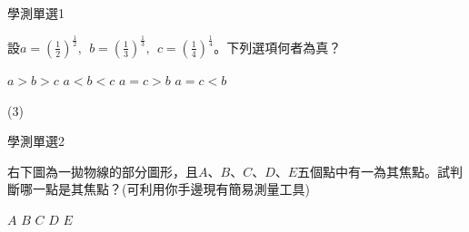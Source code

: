\begin{QUESTIONS}
    \begin{QUESTION}
        \begin{ExamInfo}{90}{學測}{單選}{1}
        \end{ExamInfo}
        \begin{ExamAnsRateInfo}{}{}{}{}
        \end{ExamAnsRateInfo}
        \begin{QBODY}
            設$a={{\left( \frac{1}{2} \right)}^{\frac{1}{2}}},\ \ b={{\left( \frac{1}{3} \right)}^{\frac{1}{3}}},\ \ c={{\left( \frac{1}{4} \right)}^{\frac{1}{4}}}$。下列選項何者為真？
            \begin{QOPS}         
                \QOP $ a > b > c $
                \QOP $ a < b < c $
                \QOP $ a = c > b $
                \QOP $ a = c < b $
            \end{QOPS}
        \end{QBODY}
        \begin{QFROMS}
        \end{QFROMS}
        \begin{QTAGS}\end{QTAGS}
        \begin{QANS}
            (3)
        \end{QANS}
        \begin{QSOLLIST}
        \end{QSOLLIST}
        \begin{QEMPTYSPACE}
        \end{QEMPTYSPACE}
    \end{QUESTION}
    \begin{QUESTION}
        \begin{ExamInfo}{90}{學測}{單選}{2}
        \end{ExamInfo}
        \begin{ExamAnsRateInfo}{}{}{}{}
        \end{ExamAnsRateInfo}
        \begin{QBODY}
            右下圖為一拋物線的部分圖形，且$ A $、$ B $、$ C $、$ D $、$ E $五個點中有一為其焦點。試判斷哪一點是其焦點？(可利用你手邊現有簡易測量工具)
			\begin{QOPS}
				\QOP $A$
				\QOP $B$
				\QOP $C$
				\QOP $D$
				\QOP $E$
			\end{QOPS}
        \end{QBODY}
        \begin{QFROMS}

\end{QFROMS}
\end{QUESTION}
\end{QUESTIONS}

